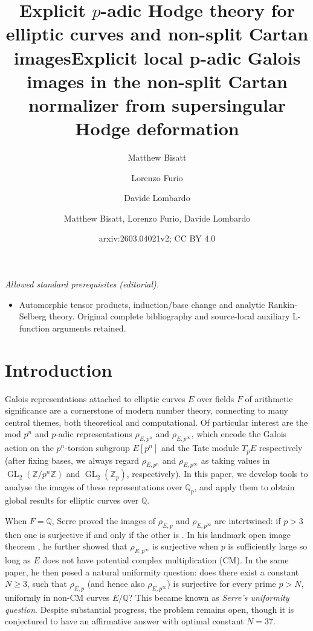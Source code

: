 \documentclass{amsart}
\title{Explicit $p$-adic Hodge theory for elliptic curves and non-split Cartan images}
\author{Matthew Bisatt}
\author{Lorenzo Furio}
\author{Davide Lombardo}
\date{}
\title{Explicit local p-adic Galois images in the non-split Cartan normalizer from supersingular Hodge deformation}
\author{Matthew Bisatt, Lorenzo Furio, Davide Lombardo}
\date{arxiv:2603.04021v2; CC BY 4.0}
\theoremstyle{definition}
\newcommand{\Z}{\mathbb{Z}}
\newcommand{\Q}{\mathbb{Q}}
\newcommand{\GL}{\operatorname{GL}}
\numberwithin{theorem}{section}
\numberwithin{equation}{section}
\begin{document}
\maketitle
\noindent\textit{Allowed standard prerequisites (editorial).}\begin{itemize}
\item Automorphic tensor products, induction/base change and analytic Rankin-Selberg theory. Original complete bibliography and source-local auxiliary L-function arguments retained.
\end{itemize}\medskip
\section{Introduction}

Galois representations attached to elliptic curves $E$ over fields $F$ of arithmetic significance are a cornerstone of modern number theory, connecting to many central themes, both theoretical and computational. Of particular interest are the mod $p^n$ and $p$-adic representations $\rho_{E,p^n}$ and $\rho_{E,p^\infty}$, which encode the Galois action on the $p^n$-torsion subgroup $E[p^n]$ and the Tate module $T_pE$ respectively (after fixing bases, we always regard $\rho_{E, p^n}$ and $\rho_{E, p^\infty}$ as taking values in $\GL_2(\Z/p^n\Z)$ and $\GL_2(\Z_p)$, respectively). In this paper, we develop tools to analyse the images of these representations over $\Q_p$, and apply them to obtain global results for elliptic curves over $\Q$.

When $F=\Q$, Serre proved the images of $\rho_{E,p}$ and $\rho_{E,p^{\infty}}$ are intertwined: if $p>3$ then one is surjective if and only if the other is \cite[IV-23, Lemma 3]{serre-abrep}. In his landmark open image theorem \cite{MR387283}, he further showed that $\rho_{E,p^{\infty}}$ is surjective when $p$ is sufficiently large so long as $E$ does not have potential complex multiplication (CM).  In the same paper, he then posed a natural uniformity question: does there exist a constant $N \geq 3$, such that $\rho_{E,p}$ (and hence also $\rho_{E,p^{\infty}}$) is surjective for every prime $p>N$, uniformly in non-CM curves $E/\Q$? This became known as \textit{Serre's uniformity question}. Despite substantial progress, the problem remains open, though it is conjectured to have an affirmative answer with optimal constant $N=37$.
\end{document}

